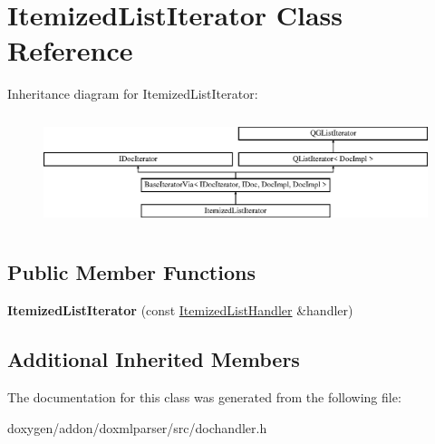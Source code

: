 \hypertarget{class_itemized_list_iterator}{}\section{Itemized\+List\+Iterator Class Reference}
\label{class_itemized_list_iterator}
Inheritance diagram for Itemized\+List\+Iterator\+:\begin{figure}[H]
\begin{center}
\leavevmode
\includegraphics[height=3.294118cm]{class_itemized_list_iterator}
\end{center}
\end{figure}
\subsection*{Public Member Functions}
\begin{DoxyCompactItemize}
\item 
\mbox{\label{class_itemized_list_iterator_a5082105447fde30b0440b07a5a41ab1b}} 
{\bfseries Itemized\+List\+Iterator} (const \mbox{\hyperlink{class_itemized_list_handler}{Itemized\+List\+Handler}} \&handler)
\end{DoxyCompactItemize}
\subsection*{Additional Inherited Members}


The documentation for this class was generated from the following file\+:\begin{DoxyCompactItemize}
\item 
doxygen/addon/doxmlparser/src/dochandler.\+h\end{DoxyCompactItemize}

